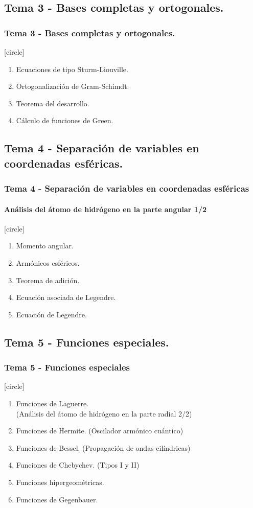 \subsection{Tema 3 - Bases completas y ortogonales.}
\begin{frame}
\frametitle{Tema 3 - Bases completas y ortogonales.}
[circle]
\begin{enumerate}[<+->]
\item Ecuaciones de tipo Sturm-Liouville.
\item Ortogonalización de Gram-Schimdt.
\item Teorema del desarrollo.
\item Cálculo de funciones de Green.   
\end{enumerate}
\end{frame}
\subsection{Tema 4 - Separación de variables en coordenadas esféricas.}
\begin{frame}
\frametitle{Tema 4 - Separación de variables en coordenadas esféricas}
\framesubtitle{Análisis del átomo de hidrógeno en la parte angular 1/2}
[circle]
\begin{enumerate}[<+->]
\item Momento angular.
\item Armónicos esféricos.
\item Teorema de adición.
\item Ecuación asociada de Legendre.
\item Ecuación de Legendre.
\end{enumerate}
\end{frame}
\subsection{Tema 5 - Funciones especiales.}
\begin{frame}
\frametitle{Tema 5 - Funciones especiales}
[circle]
\begin{enumerate}[<+->]
\item Funciones de Laguerre. \\ (Análisis del átomo de hidrógeno en la parte radial 2/2)
\item Funciones de Hermite. (Oscilador armónico cuántico)
\item Funciones de Bessel. (Propagación de ondas cilíndricas)
\item Funciones de Chebychev. (Tipos I y II)
\item Funciones hipergeométricas.
\item Funciones de Gegenbauer. 
\end{enumerate}
\end{frame}
